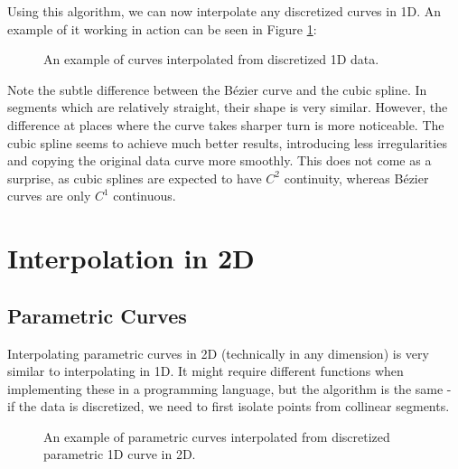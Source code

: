 \documentclass[a4paper,10pt]{report}
\begin{document}
Using this algorithm, we can now interpolate any discretized curves in 1D. An example of it working in action can be seen in Figure \ref{fig:1D_fun_interpolated}:
\begin{figure}[H]
    \centering
    \begin{subfigure}{0.6\textwidth}
        
    \end{subfigure}
    \hfill
    \begin{subfigure}{0.39\textwidth}
        
    \end{subfigure}
    \caption{An example of curves interpolated from discretized 1D data.}
    \label{fig:1D_fun_interpolated}
\end{figure}

Note the subtle difference between the Bézier curve and the cubic spline. In segments which are relatively straight, their shape is very similar. However, the difference at places where the curve takes sharper turn is more noticeable. The cubic spline seems to achieve much better results, introducing less irregularities and copying the original data curve more smoothly. This does not come as a surprise, as cubic splines are expected to have \textit{$C^2$} continuity, whereas Bézier curves are only \textit{$C^1$} continuous.

\chapter{Interpolation in 2D}\label{chap:2D}

\section{Parametric Curves}\label{sec:param_curve}
Interpolating parametric curves in 2D (technically in any dimension) is very similar to interpolating in 1D. It might require different functions when implementing these in a programming language, but the algorithm is the same - if the data is discretized, we need to first isolate points from collinear segments.
\begin{figure}[H]
    \centering
    \begin{subfigure}{0.49\textwidth}
        
    \end{subfigure}
    \hfill
    \begin{subfigure}{0.49\textwidth}
        
    \end{subfigure}
    \caption{An example of parametric curves interpolated from discretized parametric 1D curve in 2D.}
    \label{fig:2D_parametric_curve}
\end{figure}
\end{document}
